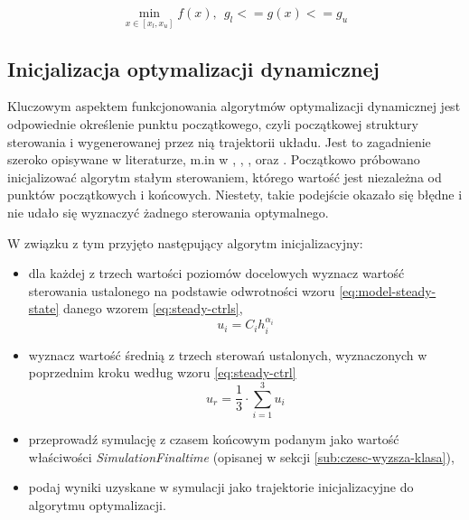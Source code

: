 \begin{equation}\label{eq:opt-stat}
    \min\limits_{x \in [x_{l}, x_{u}]} f(x),~~ g_{l} <= g(x) <= g_{u}
\end{equation}


\subsection{Inicjalizacja optymalizacji dynamicznej}
\label{sub:opt-init}

Kluczowym aspektem funkcjonowania algorytmów optymalizacji dynamicznej jest odpowiednie określenie punktu początkowego, czyli początkowej struktury sterowania i wygenerowanej przez nią trajektorii układu. Jest to zagadnienie szeroko opisywane w literaturze, m.in w \cite{Betts98}, \cite{Rao2010}, \cite{Korytowski2015}, \cite{cas+11ifac} oraz \cite{JModelicaUserGuide}.
Początkowo próbowano inicjalizować algorytm stałym sterowaniem, którego wartość jest niezależna od punktów początkowych i końcowych. Niestety, takie podejście okazało się błędne i nie udało się wyznaczyć żadnego sterowania optymalnego.

W związku z tym przyjęto następujący algorytm inicjalizacyjny:
\begin{itemize}
    \item dla każdej z trzech wartości poziomów docelowych wyznacz wartość sterowania ustalonego na podstawie odwrotności wzoru \ref{eq:model-steady-state} danego wzorem \ref{eq:steady-ctrls},
    \begin{equation} \label{eq:steady-ctrls}
    u_{i} = C_{i}h_{i}^{\alpha_{i}}
    \end{equation}
    \item wyznacz wartość średnią z trzech sterowań ustalonych, wyznaczonych w poprzednim kroku według wzoru \ref{eq:steady-ctrl}
    \begin{equation}\label{eq:steady-ctrl}
    u_{r} = \frac{1}{3} \cdot \sum_{i=1}^{3} u_{i}
    \end{equation}
    \item przeprowadź symulację z czasem końcowym podanym jako wartość właściwości \emph{SimulationFinaltime} (opisanej w sekcji \ref{sub:czesc-wyzsza-klasa}),
    \item podaj wyniki uzyskane w symulacji jako trajektorie inicjalizacyjne do algorytmu optymalizacji.
\end{itemize}


